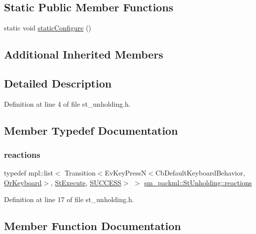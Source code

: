 \subsection*{Static Public Member Functions}
\begin{DoxyCompactItemize}
\item 
static void \hyperlink{structsm__packml_1_1StUnholding_aa4784965cafac37bf397fce056f7b02b}{static\+Configure} ()
\end{DoxyCompactItemize}
\subsection*{Additional Inherited Members}


\subsection{Detailed Description}


Definition at line 4 of file st\+\_\+unholding.\+h.



\subsection{Member Typedef Documentation}
\mbox{\label{structsm__packml_1_1StUnholding_a8fe30f4aae70738cdbac445596f86c8c}} 
\subsubsection{\texorpdfstring{reactions}{reactions}}
{\footnotesize\ttfamily typedef mpl\+::list$<$ Transition$<$Ev\+Key\+PressN$<$Cb\+Default\+Keyboard\+Behavior, \hyperlink{classsm__packml_1_1OrKeyboard}{Or\+Keyboard}$>$, \hyperlink{structsm__packml_1_1StExecute}{St\+Execute}, \hyperlink{classSUCCESS}{S\+U\+C\+C\+E\+SS}$>$ $>$ \hyperlink{structsm__packml_1_1StUnholding_a8fe30f4aae70738cdbac445596f86c8c}{sm\+\_\+packml\+::\+St\+Unholding\+::reactions}}



Definition at line 17 of file st\+\_\+unholding.\+h.



\subsection{Member Function Documentation}
\mbox{\label{structsm__packml_1_1StUnholding_ab2672ee2064fbdb338741eb2275bb864}} 
